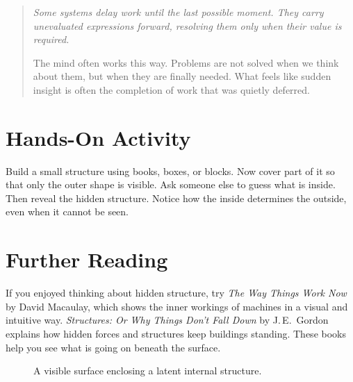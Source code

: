\documentclass[11pt]{book}
\theoremstyle{definition}
\theoremstyle{remark}
\newenvironment{literaryaside}
  {\begin{quote}\small\itshape}
  {\end{quote}}
\begin{document}
\begin{literaryaside}
Some systems delay work until the last possible moment. They carry
unevaluated expressions forward, resolving them only when their value
is required.

The mind often works this way. Problems are not solved when we think
about them, but when they are finally needed. What feels like sudden
insight is often the completion of work that was quietly deferred.
\end{literaryaside}

\section*{Hands-On Activity}

Build a small structure using books, boxes, or blocks. Now cover part
of it so that only the outer shape is visible. Ask someone else to
guess what is inside. Then reveal the hidden structure. Notice how the
inside determines the outside, even when it cannot be seen.

\section*{Further Reading}

If you enjoyed thinking about hidden structure, try \textit{The Way
Things Work Now} by David Macaulay, which shows the inner workings of
machines in a visual and intuitive way. \textit{Structures: Or Why
Things Don't Fall Down} by J.\,E.\ Gordon explains how hidden forces
and structures keep buildings standing. These books help you see what
is going on beneath the surface.

\begin{figure}[h]
\centering
{}
\caption{A visible surface enclosing a latent internal structure.}
\end{figure}
\end{document}
